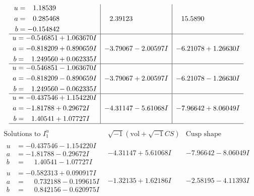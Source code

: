\documentclass[1p]{elsarticle_modified}
\theoremstyle{definition}
\newcommand{\I}{\sqrt{-1}}
\begin{document}
$$\begin{array}{c|c|c}
\begin{aligned}
u &= \phantom{-}1.18539\phantom{ +0.000000I} \\
a &= \phantom{-}0.285468\phantom{ +0.000000I} \\
b &= -0.154842\phantom{ +0.000000I}\end{aligned}
 & \phantom{-}2.39123\phantom{ +0.000000I} & \phantom{-}15.5890\phantom{ +0.000000I} \\ \hline\begin{aligned}
u &= -0.546851 + 1.063670 I \\
a &= -0.818209 + 0.890659 I \\
b &= \phantom{-}1.249560 + 0.062335 I\end{aligned}
 & -3.79067 - 2.00597 I & -6.21078 + 1.26630 I \\ \hline\begin{aligned}
u &= -0.546851 - 1.063670 I \\
a &= -0.818209 - 0.890659 I \\
b &= \phantom{-}1.249560 - 0.062335 I\end{aligned}
 & -3.79067 + 2.00597 I & -6.21078 - 1.26630 I \\ \hline\begin{aligned}
u &= -0.437546 + 1.154220 I \\
a &= -1.81788 + 0.29672 I \\
b &= \phantom{-}1.40541 + 1.07727 I\end{aligned}
 & -4.31147 - 5.61068 I & -7.96642 + 8.06049 I\\
 \hline 
 \end{array}$$\newpage$$\begin{array}{c|c|c}  
\text{Solutions to }I^u_{1}& \I (\text{vol} + \sqrt{-1}CS) & \text{Cusp shape}\\
 \hline 
\begin{aligned}
u &= -0.437546 - 1.154220 I \\
a &= -1.81788 - 0.29672 I \\
b &= \phantom{-}1.40541 - 1.07727 I\end{aligned}
 & -4.31147 + 5.61068 I & -7.96642 - 8.06049 I \\ \hline\begin{aligned}
u &= -0.582313 + 0.090917 I \\
a &= \phantom{-}0.732188 - 0.199615 I \\
b &= \phantom{-}0.842156 - 0.620975 I\end{aligned}
 & -1.32135 + 1.62186 I & -2.58195 - 4.11393 I \\ \hline\begin{aligned}

\end{aligned}
\end{array}$$
\end{document}
